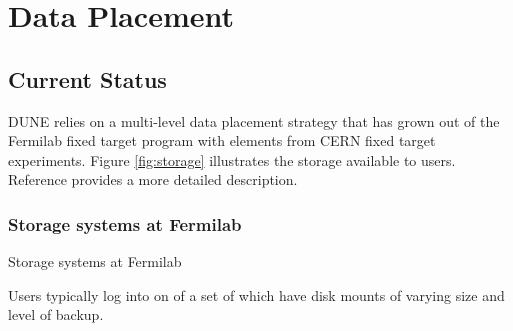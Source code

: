 \documentclass[../main-v1.tex]{subfiles}
\begin{document}
\chapter{Data Placement  }
\label{ch:place}



\section{Current Status}

DUNE relies on a multi-level data placement strategy that has grown out of the Fermilab fixed target program with elements from CERN fixed target experiments.  Figure \ref{fig:storage} illustrates the storage available to users. Reference \cite{bib:storage} provides a more detailed description. 

\subsection{Storage systems at Fermilab}
Storage systems at Fermilab

Users typically log into on of a set of   which have disk mounts of varying size and level of backup. 
\end{document}
